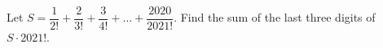 Let $S=\dfrac{1}{2!}+\dfrac{2}{3!}+\dfrac{3}{4!}+\ldots+\dfrac{2020}{2021!}$. Find the sum of the last three digits of $S\cdot2021!$.
